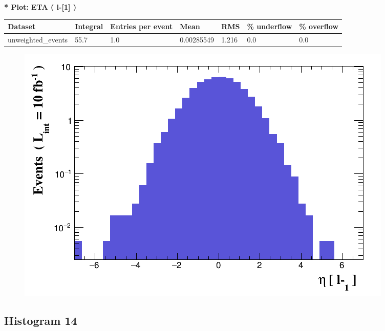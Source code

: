 \documentclass[a4paper, 10pt]{article}
\begin{document}
\textbf{* Plot: ETA ( l-[1] ) }\\
   \begin{table}[H]
  \begin{center}
    \begin{tabular}{|m{23.0mm}|m{23.0mm}|m{18.0mm}|m{19.0mm}|m{19.0mm}|m{19.0mm}|m{19.0mm}|}
      \hline
      {\cellcolor{yellow}         Dataset}& {\cellcolor{yellow}         Integral}& {\cellcolor{yellow}         Entries per event}& {\cellcolor{yellow}         Mean}& {\cellcolor{yellow}         RMS}& {\cellcolor{yellow}         \% underflow}& {\cellcolor{yellow}         \% overflow}\\
      \hline
      {\cellcolor{white}         unweighted\_events}& {\cellcolor{white}         55.7}& {\cellcolor{white}         1.0}& {\cellcolor{white}         0.00285549}& {\cellcolor{white}         1.216}& {\cellcolor{green}         0.0}& {\cellcolor{green}         0.0}\\
\hline
    \end{tabular}
  \end{center}
\end{table}

\begin{figure}[H]
  \begin{center}
    \includegraphics[scale=0.45]{selection_12.png}\\
\caption{   }
  \end{center}
\end{figure}
      \newpage
\subsection{ Histogram 14}
\end{document}
